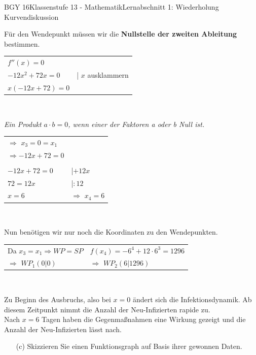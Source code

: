 \documentclass[oneside,openany,headings=optiontotoc,11pt,numbers=noenddot]{scrreprt}
\begin{document}
\begin{worksheet}{BGY 16}{Klassenstufe 13 - Mathematik}{Lernabschnitt 1: Wiederholung Kurvendiskussion}
\begin{itemize}
		\end{itemize}
		\begin{framed}
			Für den Wendepunkt müssen wir die \textbf{Nullstelle der zweiten Ableitung} bestimmen.
			\begin{tabularx}{\textwidth}{ll}
				\(f''(x) = 0\)\\
				\(-12x^2 +72x = 0\) & | \(x\) ausklammern\\
				\(x(-12x+72) = 0\)
			\end{tabularx}\\
			\par\noindent
			\textit{Ein Produkt \(a\cdot{}b = 0\), wenn einer der Faktoren a oder b Null ist.}\\
			\par\noindent
			\begin{tabularx}{\textwidth}{ll}
				\(\Rightarrow\) \colorbox{green!5}{\(x_3 = 0 = x_1\)}\\
				\(\Rightarrow -12x+72 = 0\)\\
				\\
				\(-12x+72 = 0\) & |\(+12x\)\\
				\(72 = 12x\) & |\(:12\)\\
				\(x=6\) & \(\Rightarrow\) \colorbox{green!5}{\(x_4 = 6\)}
			\end{tabularx}\\
			\par\noindent
			Nun benötigen wir nur noch die Koordinaten zu den Wendepunkten.\\
			\par\noindent
			\begin{tabularx}{\textwidth}{XX}
				Da \(x_3 = x_1 \Rightarrow WP = SP\) & \(f(x_4) = -6^4 + 12\cdot{}6^3 = 1296\)\\
				\(\Rightarrow\) \colorbox{green!10}{\(WP_1(0|0)\)} & \(\Rightarrow\) \colorbox{green!10}{\(WP_2(6|1296)\)}
			\end{tabularx}\\
			\par\bigskip\noindent
			Zu Beginn des Ausbruchs, also bei \(x = 0\) ändert sich die Infektionsdynamik. Ab diesem Zeitpunkt nimmt die Anzahl der Neu-Infizierten rapide zu.\\
			Nach \(x=6\) Tagen haben die Gegenmaßnahmen eine Wirkung gezeigt und die Anzahl der Neu-Infizierten lässt nach. 
		\end{framed}
		\newpage
		\begin{itemize}
			\item[(c)] Skizzieren Sie einen Funktionsgraph auf Basis ihrer gewonnen Daten.

\end{itemize}
\end{worksheet}
\end{document}
